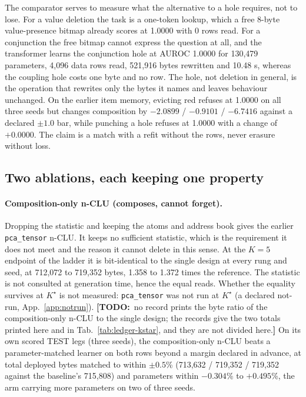 \documentclass{article} %
\newcommand{\TODO}[1]{{\color{orange}\textbf{[TODO:}~#1\textbf{]}}}
\newcommand{\Kstar}{\ensuremath{K^{\star}}}
\begin{document}
\noindent The comparator serves to measure what the alternative to a hole requires, not to lose. For a value
deletion the task is a one-token lookup, which a free 8-byte value-presence bitmap already scores
at 1.0000 with 0 rows read. For a conjunction the free bitmap cannot express the question at
all, and the transformer learns the conjunction hole at AUROC 1.0000 for 130,479 parameters,
4,096 data rows read, 521,916 bytes rewritten and 10.48 s, whereas the coupling hole costs one
byte and no row. %
\noindent The hole, not deletion in general, is the operation that rewrites only the bytes it names and
leaves behaviour unchanged. On the earlier item memory, evicting red refuses at 1.0000 on all three
seeds but changes composition by $-2.0899$ / $-0.9101$ / $-6.7416$ against a declared $\pm1.0$ bar,
while punching a hole refuses at 1.0000 with a change of $+0.0000$. %
The claim is a match with a refit without the rows, never erasure without loss.

\subsection{Two ablations, each keeping one property}
\label{sec:ablations}

\paragraph{Composition-only n-CLU (composes, cannot forget).} Dropping the statistic and keeping the atoms and address book gives the earlier \texttt{pca\_tensor} n-CLU. It keeps no
sufficient statistic, which is the requirement it does not meet and the reason it cannot delete in this sense. At the $K=5$ endpoint of the ladder it is bit-identical to the single design at every rung and seed, at 712,072 to 719,352 bytes, 1.358 to 1.372 times the reference.
The statistic is not consulted at generation time, hence the equal reads. Whether the
equality survives at $\Kstar$ is not measured: \texttt{pca\_tensor} was not run at
$\Kstar$ (a declared not-run, App.~\ref{app:notrun}). \TODO{no record prints the byte ratio of the composition-only n-CLU to the single design;
the records give the two totals printed here and in Tab.~\ref{tab:ledger-kstar}, and they are
not divided here.}
On its own scored TEST legs (three seeds), the composition-only n-CLU beats a parameter-matched
learner on both rows beyond a margin declared in advance, at total deployed bytes matched to within $\pm0.5$\% (713,632 / 719,352 / 719,352 against the baseline's 715,808) and parameters within $-0.304$\% to $+0.495$\%, the arm carrying more parameters on two of three seeds.
\end{document}
